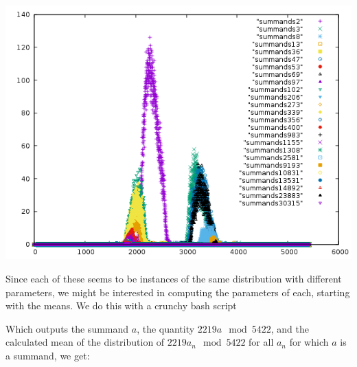 \documentclass{report}
\theoremstyle{remark}
\numberwithin{equation}{section}
\begin{document}
\includegraphics[scale=0.5]{../figs/summands_mod_5422.png}

Since each of these seems to be instances of the same distribution
with different parameters, we might be interested in computing the
parameters of each, starting with the means.  We do this with a crunchy bash script




Which outputs the summand $a$, the quantity $2219 a \mod {5422}$, and
the calculated mean of the distribution of $2219 a_n \mod{5422}$ for
all $a_n$ for which $a$ is a summand, we get:
\end{document}
